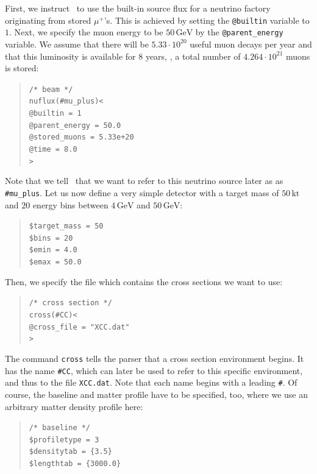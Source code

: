 %
First, we instruct \GLOBES\ to use the built-in source flux for a neutrino factory
originating from stored $\mu^+$'s. This is achieved by setting the {\tt @builtin} variable to $1$. Next, we specify the muon energy to be $50\,\mathrm{GeV}$ by the {\tt @parent\_energy} variable. We assume 
that there will be $5.33\cdot 10^{20}$ useful muon decays per year
and that this luminosity is available for $8$ years, \ie , a total number
of $ 4.264\cdot10^{21}$ muons is stored:
\begin{quote}
{\tt /* beam */}\\
{\tt nuflux(\#mu\_plus)<\\
\tb  @builtin = 1\\
\tb  @parent\_energy = 50.0\\
\tb  @stored\_muons = 5.33e+20\\
\tb  @time = 8.0\\
>}\\
\end{quote}
Note that we tell \GLOBES\ that we want to refer to this neutrino source later as as {\tt \#mu\_plus}. 
%
Let us now define a very simple detector with a target mass 
of $50\,\mathrm{kt}$ and $20$ energy bins between
$4\,\mathrm{GeV}$ and $50\,\mathrm{GeV}$: 
\begin{quote}
{\tt \$target\_mass = 50}\\
{\tt \$bins = 20}\\
{\tt \$emin = 4.0}\\
{\tt \$emax = 50.0}
\end{quote}
Then, we specify the file which contains the cross sections we want to 
use:
\begin{quote}
{\tt /* cross section */}\\
{\tt cross(\#CC)<}\\
{\tt \tb @cross\_file = "XCC.dat"}\\
{\tt >}
\end{quote}
The command {\tt cross} tells the parser that a cross section environment
begins. It has the name {\tt \#CC}, which can later be used to refer 
to this specific environment, and thus to the file {\tt XCC.dat}. Note that each name begins with a leading {\tt \#}.
%
Of course, the baseline and matter profile have to be specified, too, where
we use an arbitrary matter density profile here:
\begin{quote}
{\tt /* baseline */}\\
{\tt \$profiletype = 3}\\
{\tt \$densitytab = \{3.5\}}\\
{\tt \$lengthtab = \{3000.0\}}\\
\end{quote}
